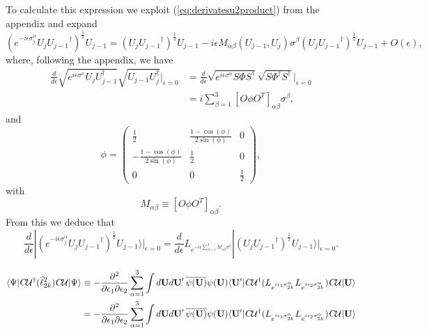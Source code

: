 \documentclass[12pt]{amsart}
\theoremstyle{definition}
\theoremstyle{remark}
\numberwithin{equation}{section}
\begin{document}
To calculate this expression we exploit (\ref{eq:derivatesu2product}) from the appendix and expand
\begin{equation}
	(e^{-i\epsilon\sigma^\alpha_j}U_{j} {U_{j-1}}^\dag)^{\frac12} U_{j-1} = (U_{j} {U_{j-1}}^\dag)^{\frac12} U_{j-1} - i\epsilon M_{\alpha\beta}(U_{j-1}, U_{j})\sigma^\beta(U_{j} {U_{j-1}}^\dag)^{\frac12} U_{j-1} + O(\epsilon),
\end{equation}
where, following the appendix, we have
\begin{equation}
	\begin{split}
		\frac{d}{d\epsilon}\sqrt{e^{i\epsilon \sigma^\alpha} U_{j}U_{j-1}^\dag}\sqrt{U_{j-1}U_{j}^\dag}\Bigg|_{\epsilon = 0} &= \frac{d}{d\epsilon}\sqrt{e^{i\epsilon \sigma^\alpha} S\Phi S^\dag}\sqrt{S\Phi^\dag S^\dag}\Bigg|_{\epsilon = 0} \\
		&= i\sum_{\beta = 1}^3 [O\phi O^T]_{\alpha\beta}\sigma^\beta,
	\end{split}
\end{equation}
and
\begin{equation}
	\phi = \begin{pmatrix}
		\frac12 & \frac{1-\cos(\phi)}{2\sin(\phi)} & 0 \\
		-\frac{1-\cos(\phi)}{2\sin(\phi)} & \frac12 & 0 \\
		0 & 0 & \frac12
	\end{pmatrix},
\end{equation}
with
\begin{equation}
	M_{\alpha\beta} \equiv [O\phi O^T]_{\alpha\beta}.
\end{equation}
From this we deduce that
\begin{equation}
	\frac{d}{d\epsilon}|(e^{-i\epsilon\sigma^\alpha_j}U_{j} {U_{j-1}}^\dag)^{\frac12} U_{j-1}\rangle\Big|_{\epsilon = 0} = \frac{d}{d\epsilon} L_{e^{-i\epsilon \sum_{\beta = 1}^3M_{\alpha\beta}\sigma^\beta}} |(U_{j} {U_{j-1}}^\dag)^{\frac12} U_{j-1}\rangle\Big|_{\epsilon = 0}.
\end{equation}


\begin{equation}
	\begin{split}
		\langle \Psi|\textsl{C}\mathcal{U}^\dag (\widehat{\ell}^2_{2k})\textsl{C}\mathcal{U}|\Psi\rangle &\equiv -\frac{\partial^2}{\partial\epsilon_1\partial \epsilon_2}\sum_{\alpha = 1}^3\int d\mathbf{U}d\mathbf{U}'\, \overline{\psi(\mathbf{U})}\psi(\mathbf{U})  \langle \mathbf{U}'|\textsl{C}\mathcal{U}^\dag (L_{e^{i\epsilon_1 \sigma^{\alpha}_{2k}}}L_{e^{i\epsilon_2 \sigma_{2k}^{\alpha}}})\textsl{C}\mathcal{U}|\mathbf{U}\rangle \\
		&=-\frac{\partial^2}{\partial\epsilon_1\partial \epsilon_2}\sum_{\alpha = 1}^3\int d\mathbf{U}d\mathbf{U}'\, \overline{\psi(\mathbf{U})}\psi(\mathbf{U})  \langle \mathbf{U}'|\textsl{C}\mathcal{U}^\dag (L_{e^{i\epsilon_1 \sigma^{\alpha}_{2k}}}L_{e^{i\epsilon_2 \sigma_{2k}^{\alpha}}})\textsl{C}\mathcal{U}|\mathbf{U}\rangle 
	\end{split}
\end{equation}
\end{document}

